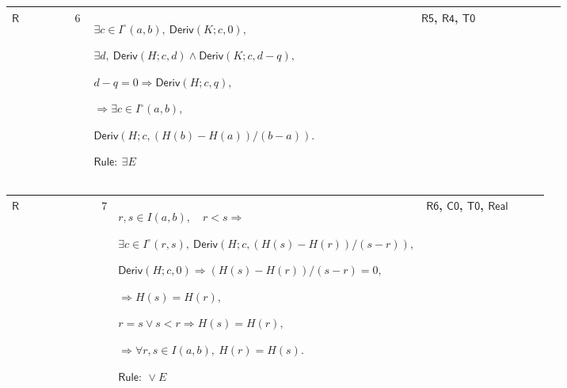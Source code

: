 \documentclass[12pt,reqno]{amsart}
\theoremstyle{blueplain}
\numberwithin{equation}{section}
\newlength{\FTCOneColumnBody}
\begin{document}
{\scriptsize \setlength{\parskip}{0pt}\nointerlineskip
\noindent 
\begin{tabular}{|@{}>{\centering\arraybackslash}m{0.10658\linewidth}|>{\centering\arraybackslash}m{0.03553\linewidth}|>{\centering\arraybackslash}m{0.52105\linewidth}|>{\centering\arraybackslash}m{0.23684\linewidth}|}
\hline
\hypertarget{proof:R6}{$\displaystyle \mathsf{R}$} & $\displaystyle 6$ & $%
\displaystyle \exists c\in I^\circ(a,b),\ \mathsf{Deriv}(K;c,0),$\par$%
\displaystyle \exists d,\ \mathsf{Deriv}(H;c,d)\land\mathsf{Deriv}(K;c,d-q),$%
\par$\displaystyle d-q=0\Rightarrow\mathsf{Deriv}(H;c,q),$\par$\displaystyle %
\Rightarrow\exists c\in I^\circ(a,b),$\par$\displaystyle \mathsf{Deriv}%
(H;c,(H(b)-H(a))/(b-a)).$\par$\displaystyle \mathsf{Rule}:\ \exists E$ & 
\hyperlink{proof:R5}{$\displaystyle \mathsf{R5}$}, \hyperlink{proof:R4}{$%
\displaystyle \mathsf{R4}$}, \hyperlink{proof:T0}{$\displaystyle \mathsf{T0}$%
} \\ \hline
\end{tabular}%
}

{\scriptsize \setlength{\parskip}{0pt}\nointerlineskip
\noindent 
\begin{tabular}{|@{}>{\centering\arraybackslash}m{\FTCOneColumnBody}|}
\hline
$\displaystyle \mathsf{Context\_ZeroDerivative}:=$\par$\displaystyle %
a<b,\quad\mathsf{Cont}(H;a,b),$\par$\displaystyle \forall x\in
I^\circ(a,b),\ \mathsf{Deriv}(H;x,0).$ \\ \hline
\end{tabular}%
}

{\scriptsize \setlength{\parskip}{0pt}\nointerlineskip
\noindent 
\begin{tabular}{|@{}>{\centering\arraybackslash}m{0.10658\linewidth}|>{\centering\arraybackslash}m{0.03553\linewidth}|>{\centering\arraybackslash}m{0.52105\linewidth}|>{\centering\arraybackslash}m{0.23684\linewidth}|}
\hline
\hypertarget{proof:R7}{$\displaystyle \mathsf{R}$} & $\displaystyle 7$ & $%
\displaystyle r,s\in I(a,b),\quad r<s\Rightarrow$\par$\displaystyle \exists
c\in I^\circ(r,s),\ \mathsf{Deriv}(H;c,(H(s)-H(r))/(s-r)),$\par$%
\displaystyle \mathsf{Deriv}(H;c,0)\Rightarrow(H(s)-H(r))/(s-r)=0,$\par$%
\displaystyle \Rightarrow H(s)=H(r),$\par$\displaystyle r=s\lor
s<r\Rightarrow H(s)=H(r),$\par$\displaystyle \Rightarrow\forall r,s\in
I(a,b),\ H(r)=H(s).$\par$\displaystyle \mathsf{Rule}:\ \lor E$ & \hyperlink{proof:R6}%
{$\displaystyle \mathsf{R6}$}, \hyperlink{proof:C0}{$\displaystyle \mathsf{C0%
}$}, \hyperlink{proof:T0}{$\displaystyle \mathsf{T0}$}, \hyperlink{ax:Real}{$%
\displaystyle \mathsf{Real}$} \\ \hline
\end{tabular}%
}
\end{document}
